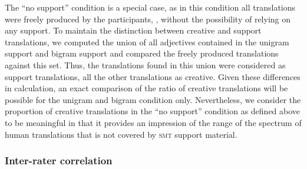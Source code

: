 \documentclass[output=paper]{LSP/langsci}
\begin{document}
The ``no support'' condition is a special case, as in this condition
all translations were freely produced by the participants, \ie,
without the possibility of relying on any support. To maintain the
distinction between creative and support translations, we computed the
union of all adjectives contained in the unigram support and
bigram support and compared the freely produced translations
against this set. Thus, the translations found in this union were
considered as support translations, all the other translations as
creative. Given these differences in calculation, an exact comparison 
of the ratio of creative translations will be possible for the unigram 
and bigram condition only. Nevertheless, we consider the proportion of
creative translations in the ``no support'' condition as defined above
to be meaningful in that it provides an impression of the range of 
the spectrum of human translations that is not covered by \textsc{smt} support material.


%

\subsubsection{Inter-rater correlation}
\label{sec:kremer:irc}
\end{document}
